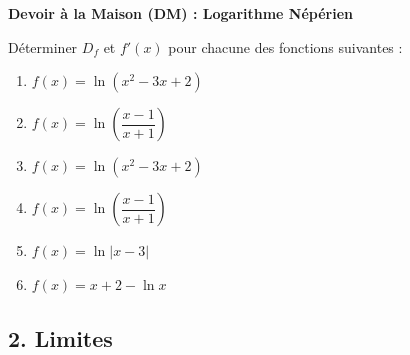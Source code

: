 \documentclass[12pt,a4paper]{article}
\begin{document}
\begin{center}
    \Large\bfseries Devoir à la Maison (DM) : Logarithme Népérien
\end{center}

\vspace{0.5cm}

Déterminer $D_f$ et $f'(x)$ pour chacune des fonctions suivantes :

\begin{enumerate}
    \item $f(x) = \ln(x^2 - 3x + 2)$
    
    \dotfill
    
    \dotfill
    
    \dotfill
    
    \dotfill
    
    \item $f(x) = \ln\left(\dfrac{x - 1}{x + 1}\right)$
    
    \dotfill
    
    \dotfill
    
    \dotfill
    
    \dotfill
    \item $f(x) = \ln(x^2 - 3x + 2)$
    
    \dotfill
    
    \dotfill
    
    \dotfill
    
    \item $f(x) = \ln\left(\dfrac{x - 1}{x + 1}\right)$
    
    \dotfill
    
    \dotfill
    
    \dotfill
    
    \item $f(x) = \ln|x - 3|$
    
    \dotfill
    
    \dotfill
    
    \dotfill
    
    \item $f(x) = x + 2 - \ln x$
    
    \dotfill
    
    \dotfill
    
    \dotfill
\end{enumerate}

\subsection*{\color{myred}2. Limites}
\end{document}

